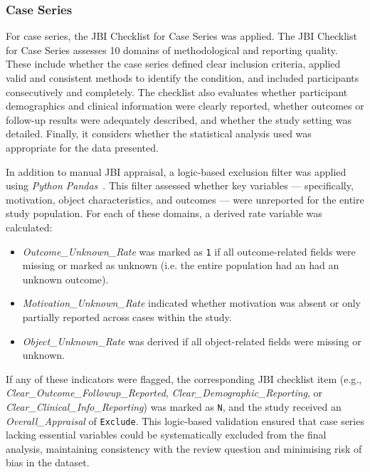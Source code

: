 \subsubsection{Case Series}
For case series, the JBI Checklist for Case Series was applied. The JBI Checklist for Case Series assesses 10 domains of methodological and reporting quality. These include whether the case series defined clear inclusion criteria, applied valid and consistent methods to identify the condition, and included participants consecutively and completely. The checklist also evaluates whether participant demographics and clinical information were clearly reported, whether outcomes or follow-up results were adequately described, and whether the study setting was detailed. Finally, it considers whether the statistical analysis used was appropriate for the data presented.

In addition to manual JBI appraisal, a logic-based exclusion filter was applied using \textit{Python Pandas}~\cite{ThePandasDevelopmentTeam_2020}. This filter assessed whether key variables --- specifically, motivation, object characteristics, and outcomes --- were unreported for the entire study population. For each of these domains, a derived rate variable was calculated:

\begin{itemize}
\item \textit{Outcome\_Unknown\_Rate} was marked as \texttt{1} if all outcome-related fields were missing or marked as unknown (i.e. the entire population had an had an unknown outcome).
\item \textit{Motivation\_Unknown\_Rate} indicated whether motivation was absent or only partially reported across cases within the study.
\item \textit{Object\_Unknown\_Rate} was derived if all object-related fields were missing or unknown.
\end{itemize}

If any of these indicators were flagged, the corresponding JBI checklist item (e.g., \textit{Clear\_Outcome\_Followup\_Reported}, \textit{Clear\_Demographic\_Reporting}, or \textit{Clear\_Clinical\_Info\_Reporting}) was marked as \texttt{N}, and the study received an \textit{Overall\_Appraisal} of \texttt{Exclude}. This logic-based validation ensured that case series lacking essential variables could be systematically excluded from the final analysis, maintaining consistency with the review question and minimising risk of bias in the dataset.\\

